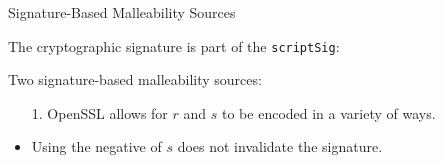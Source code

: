 \documentclass[]{beamer}
\begin{document}
\begin{frame}{Signature-Based Malleability Sources}

	The cryptographic signature is part of the \texttt{scriptSig}:\\
	
	\begin{scriptsize}
		\begin{figure}
			
		\end{figure}
	\end{scriptsize}
	
	Two signature-based malleability sources:
	\begin{itemize}
		\item[1.] OpenSSL allows for $r$ and $s$ to be encoded in a variety of ways.
		\item<2-> [2.] Using the negative of $s$ does not invalidate the signature.
	\end{itemize}
	

\end{frame}
\end{document}
